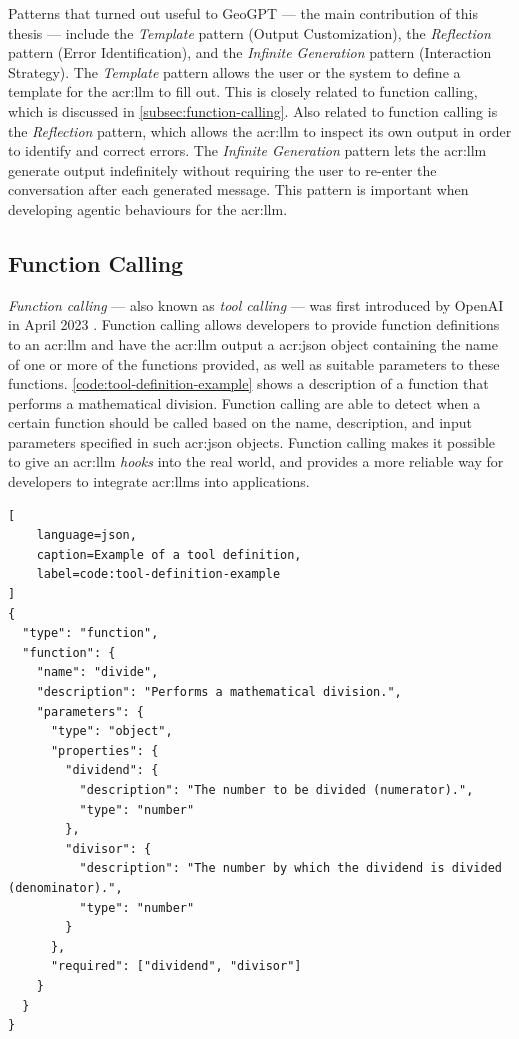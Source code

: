 Patterns that turned out useful to GeoGPT --- the main contribution of this thesis --- include the \textit{Template} pattern (Output Customization), the \textit{Reflection} pattern (Error Identification), and the \textit{Infinite Generation} pattern (Interaction Strategy). The \textit{Template} pattern allows the user or the system to define a template for the \acrshort{acr:llm} to fill out. This is closely related to function calling, which is discussed in \autoref{subsec:function-calling}. Also related to function calling is the \textit{Reflection} pattern, which allows the \acrshort{acr:llm} to inspect its own output in order to identify and correct errors. The \textit{Infinite Generation} pattern lets the \acrshort{acr:llm} generate output indefinitely without requiring the user to re-enter the conversation after each generated message. This pattern is important when developing agentic behaviours for the \acrshort{acr:llm}.


\subsection[Function Calling LLMs]{Function Calling }
\label{subsec:function-calling}

\textit{Function calling} --- also known as \textit{tool calling} --- was first introduced by OpenAI in April 2023 \citep{eletiFunctionCallingOther2023}. Function calling allows developers to provide function definitions to an \gls{acr:llm} and have the \gls{acr:llm} output a \acrshort{acr:json} object containing the name of one or more of the functions provided, as well as suitable parameters to these functions. \autoref{code:tool-definition-example} shows a description of a function that performs a mathematical division. Function calling  are able to detect when a certain function should be called based on the name, description, and input parameters specified in such \acrshort{acr:json} objects. Function calling makes it possible to give an \gls{acr:llm} \textit{hooks} into the real world, and provides a more reliable way for developers to integrate \glspl{acr:llm} into applications.

\begin{lstlisting}[
    language=json,
    caption=Example of a tool definition,
    label=code:tool-definition-example
]
{
  "type": "function",
  "function": {
    "name": "divide",
    "description": "Performs a mathematical division.",
    "parameters": {
      "type": "object",
      "properties": {
        "dividend": {
          "description": "The number to be divided (numerator).",
          "type": "number"
        },
        "divisor": {
          "description": "The number by which the dividend is divided (denominator).",
          "type": "number"
        }
      },
      "required": ["dividend", "divisor"]
    }
  }
}
\end{lstlisting}

